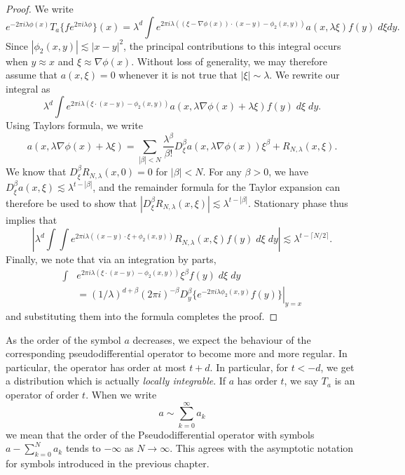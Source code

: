 \begin{proof}
    We write
    \[ e^{-2 \pi i \lambda \phi(x)} T_a \{ f e^{2 \pi i \lambda \phi } \}(x) = \lambda^d \int e^{2 \pi i \lambda ( (\xi - \nabla \phi(x)) \cdot (x - y) - \phi_2(x,y))} a(x, \lambda \xi) f(y)\; d\xi dy. \]
    Since $|\phi_2(x,y)| \lesssim |x - y|^2$, the principal contributions to this integral occurs when $y \approx x$ and $\xi \approx \nabla \phi(x)$. Without loss of generality, we may therefore assume that $a(x,\xi) = 0$ whenever it is not true that $|\xi| \sim \lambda$. We rewrite our integral as
    \[ \lambda^d \int e^{2 \pi i \lambda ( \xi \cdot (x - y) - \phi_2(x,y) )} a(x, \lambda \nabla \phi(x) + \lambda \xi) f(y)\; d\xi\; dy. \]
    Using Taylors formula, we write
    \[ a(x, \lambda \nabla \phi(x) + \lambda \xi) = \sum_{|\beta| < N} \frac{\lambda^\beta}{\beta !} D_\xi^\beta a(x, \lambda \nabla \phi(x)) \xi^\beta + R_{N,\lambda}(x,\xi). \]
    We know that $D_\xi^\beta R_{N,\lambda}(x,0) = 0$ for $|\beta| < N$. For any $\beta > 0$, we have $D_\xi^\beta a(x,\xi) \lesssim \lambda^{t - |\beta|}$, and the remainder formula for the Taylor expansion can therefore be used to show that $|D_\xi^\beta R_{N,\lambda}(x,\xi)| \lesssim \lambda^{t - |\beta|}$. Stationary phase thus implies that
    \[ \left| \lambda^d \int \int e^{2 \pi i \lambda ((x - y) \cdot \xi + \phi_2(x,y))} R_{N,\lambda}(x,\xi) f(y)\; d\xi\; dy \right| \lesssim \lambda^{t - \lceil N/2 \rceil}. \]
    Finally, we note that via an integration by parts,
    \begin{align*}
        \int & e^{2 \pi i \lambda (\xi \cdot (x - y) - \phi_2(x,y))} \xi^\beta f(y)\; d\xi\; dy\\
        &= (1/\lambda)^{d + \beta} (2 \pi i)^{-\beta} \left. D_y^\beta \{ e^{- 2 \pi i \lambda \phi_2(x,y)} f(y) \} \right|_{y = x}
    \end{align*}
    and substituting them into the formula completes the proof.
\end{proof}

As the order of the symbol $a$ decreases, we expect the behaviour of the corresponding pseudodifferential operator to become more and more regular. In particular, the operator has order at most $t + d$. In particular, for $t < - d$, we get a distribution which is actually \emph{locally integrable}. If $a$ has order $t$, we say $T_a$ is an operator of order $t$. When we write
%
\[ a \sim \sum_{k = 0}^\infty a_k \]
%
we mean that the order of the Pseudodifferential operator with symbols $a - \sum_{k = 0}^N a_k$ tends to $-\infty$ as $N \to \infty$. This agrees with the asymptotic notation for symbols introduced in the previous chapter.

